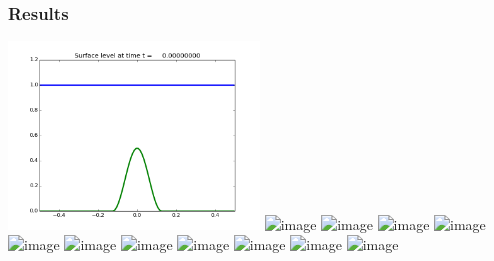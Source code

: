 \documentclass{beamer}
\begin{document}
\begin{frame}
  \frametitle{Results}
  \begin{center}
    \includegraphics[width=0.5\textwidth]{../results/still-cosine-initial.png}
    \includegraphics<1>[width=0.5\textwidth]{../results/still-cosine-unbalanced-01.png}
    \includegraphics<2>[width=0.5\textwidth]{../results/still-cosine-unbalanced-02.png}
    \includegraphics<3>[width=0.5\textwidth]{../results/still-cosine-unbalanced-03.png}
    \includegraphics<4>[width=0.5\textwidth]{../results/still-cosine-unbalanced-04.png}
    \includegraphics<5>[width=0.5\textwidth]{../results/still-cosine-unbalanced-05.png}
    \includegraphics<6>[width=0.5\textwidth]{../results/still-cosine-unbalanced-06.png}
    \includegraphics<7>[width=0.5\textwidth]{../results/still-cosine-unbalanced-07.png}
    \includegraphics<8>[width=0.5\textwidth]{../results/still-cosine-unbalanced-08.png}
    \includegraphics<9>[width=0.5\textwidth]{../results/still-cosine-unbalanced-09.png}
    \includegraphics<10>[width=0.5\textwidth]{../results/still-cosine-unbalanced-10.png}
    \includegraphics<11>[width=0.5\textwidth]{../results/still-cosine-unbalanced-11.png}
  \end{center}
\end{frame}



\end{document}
